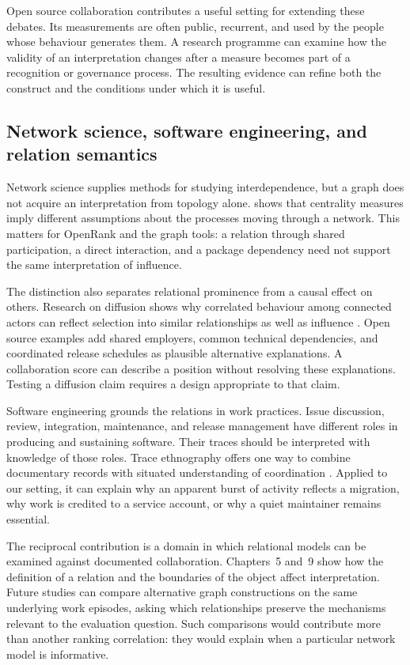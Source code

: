 Open source collaboration contributes a useful setting for extending these debates. Its measurements are often public, recurrent, and used by the people whose behaviour generates them. A research programme can examine how the validity of an interpretation changes after a measure becomes part of a recognition or governance process. The resulting evidence can refine both the construct and the conditions under which it is useful.

\subsection{Network science, software engineering, and relation semantics}
Network science supplies methods for studying interdependence, but a graph does not acquire an interpretation from topology alone. \citet{borgatti2005} shows that centrality measures imply different assumptions about the processes moving through a network. This matters for OpenRank and the graph tools: a relation through shared participation, a direct interaction, and a package dependency need not support the same interpretation of influence.

The distinction also separates relational prominence from a causal effect on others. Research on diffusion shows why correlated behaviour among connected actors can reflect selection into similar relationships as well as influence \citep{aral2009}. Open source examples add shared employers, common technical dependencies, and coordinated release schedules as plausible alternative explanations. A collaboration score can describe a position without resolving these explanations. Testing a diffusion claim requires a design appropriate to that claim.

Software engineering grounds the relations in work practices. Issue discussion, review, integration, maintenance, and release management have different roles in producing and sustaining software. Their traces should be interpreted with knowledge of those roles. Trace ethnography offers one way to combine documentary records with situated understanding of coordination \citep{geiger2011}. Applied to our setting, it can explain why an apparent burst of activity reflects a migration, why work is credited to a service account, or why a quiet maintainer remains essential.

The reciprocal contribution is a domain in which relational models can be examined against documented collaboration. Chapters~5 and~9 show how the definition of a relation and the boundaries of the object affect interpretation. Future studies can compare alternative graph constructions on the same underlying work episodes, asking which relationships preserve the mechanisms relevant to the evaluation question. Such comparisons would contribute more than another ranking correlation: they would explain when a particular network model is informative.

